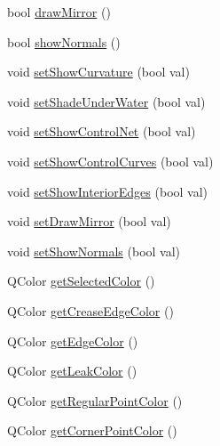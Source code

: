 \begin{DoxyCompactItemize}
\item 
bool \hyperlink{classShipCADGeometry_1_1SubdivisionSurface_ab68edba6d7b7350a39d777200e71b5e1}{draw\-Mirror} ()
\item 
bool \hyperlink{classShipCADGeometry_1_1SubdivisionSurface_a69852b83026fd12dd2dea75d2c68839a}{show\-Normals} ()
\item 
void \hyperlink{classShipCADGeometry_1_1SubdivisionSurface_af59c8172e7578be54d689779c7da7099}{set\-Show\-Curvature} (bool val)
\item 
void \hyperlink{classShipCADGeometry_1_1SubdivisionSurface_a69f08c4bd0e51a8a5d73eab2218d5556}{set\-Shade\-Under\-Water} (bool val)
\item 
void \hyperlink{classShipCADGeometry_1_1SubdivisionSurface_a83fc1704bb991aa6a948f93bf7e36a93}{set\-Show\-Control\-Net} (bool val)
\item 
void \hyperlink{classShipCADGeometry_1_1SubdivisionSurface_a718b01ea4fcf3dcde81c7215fa5da9c8}{set\-Show\-Control\-Curves} (bool val)
\item 
void \hyperlink{classShipCADGeometry_1_1SubdivisionSurface_adfa9f3ad89905c093c878de1891bcf31}{set\-Show\-Interior\-Edges} (bool val)
\item 
void \hyperlink{classShipCADGeometry_1_1SubdivisionSurface_a5d5672a862147a445a45bcccff793994}{set\-Draw\-Mirror} (bool val)
\item 
void \hyperlink{classShipCADGeometry_1_1SubdivisionSurface_a0829b1761cfce60f5cd68f00a45a37a6}{set\-Show\-Normals} (bool val)
\item 
Q\-Color \hyperlink{classShipCADGeometry_1_1SubdivisionSurface_ad6695d1d6b1d1410f36be190d0361235}{get\-Selected\-Color} ()
\item 
Q\-Color \hyperlink{classShipCADGeometry_1_1SubdivisionSurface_a654de66b37e4094d6fb9b8a2e40a5de6}{get\-Crease\-Edge\-Color} ()
\item 
Q\-Color \hyperlink{classShipCADGeometry_1_1SubdivisionSurface_ab932f5a4313393e65a1627c2ba924840}{get\-Edge\-Color} ()
\item 
Q\-Color \hyperlink{classShipCADGeometry_1_1SubdivisionSurface_adc1408be06e16bcb0d02901ff4d6469f}{get\-Leak\-Color} ()
\item 
Q\-Color \hyperlink{classShipCADGeometry_1_1SubdivisionSurface_ae04ad2348396b33fe00b1e2b0ae58ea9}{get\-Regular\-Point\-Color} ()
\item 
Q\-Color \hyperlink{classShipCADGeometry_1_1SubdivisionSurface_a089168e9a8940de6ba2292793cce9d7a}{get\-Corner\-Point\-Color} ()
\item 

\end{DoxyCompactItemize}
